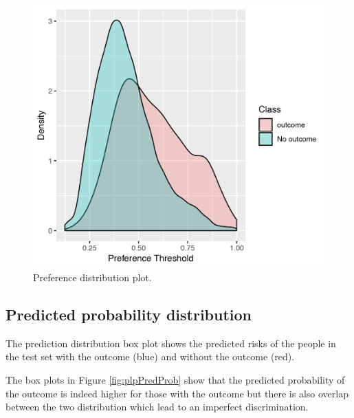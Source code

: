 \documentclass[]{book}
\begin{document}
\begin{figure}

{\centering \includegraphics[width=0.9\linewidth]{images/PatientLevelPrediction/preferencePDF} 

}

\caption{Preference distribution plot.}\label{fig:plpPreference}
\end{figure}

\subsection{Predicted probability
distribution}\label{predicted-probability-distribution}

The prediction distribution box plot shows the predicted risks of the
people in the test set with the outcome (blue) and without the outcome
(red).

The box plots in Figure \ref{fig:plpPredProb} show that the predicted
probability of the outcome is indeed higher for those with the outcome
but there is also overlap between the two distribution which lead to an
imperfect discrimination.
\end{document}
